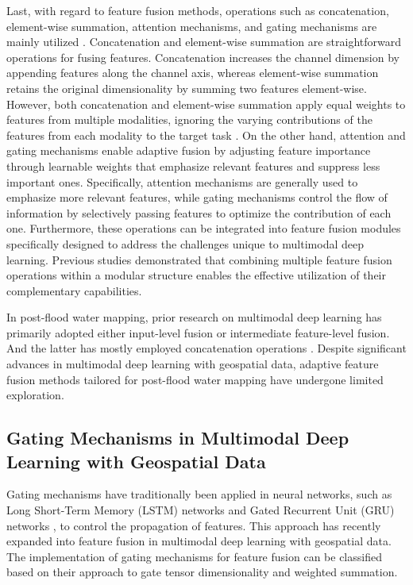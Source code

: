 \documentclass[preprint,12pt,authoryear]{elsarticle}
\begin{document}
Last, with regard to feature fusion methods, operations such as concatenation, element-wise summation, attention mechanisms, and gating mechanisms are mainly utilized \citep{huang2023deep, mena2024common}. Concatenation and element-wise summation are straightforward operations for fusing features. Concatenation increases the channel dimension by appending features along the channel axis, whereas element-wise summation retains the original dimensionality by summing two features element-wise. However, both concatenation and element-wise summation apply equal weights to features from multiple modalities, ignoring the varying contributions of the features from each modality to the target task \citep{li2020collaborative}. On the other hand, attention and gating mechanisms enable adaptive fusion by adjusting feature importance through learnable weights that emphasize relevant features and suppress less important ones. Specifically, attention mechanisms are generally used to emphasize more relevant features, while gating mechanisms control the flow of information by selectively passing features to optimize the contribution of each one. Furthermore, these operations can be integrated into feature fusion modules specifically designed to address the challenges unique to multimodal deep learning. Previous studies \citep{li2020collaborative, xu2023road} demonstrated that combining multiple feature fusion operations within a modular structure enables the effective utilization of their complementary capabilities.

In post-flood water mapping, prior research on multimodal deep learning has primarily adopted either input-level fusion \citep{bai2021enhancement, konapala2021exploring, wang2024multi} or intermediate feature-level fusion. And the latter has mostly employed concatenation operations \citep{drakonakis2022ombrianet, munoz2021local}. Despite significant advances in multimodal deep learning with geospatial data, adaptive feature fusion methods tailored for post-flood water mapping have undergone limited exploration.

\subsection{Gating Mechanisms in Multimodal Deep Learning with Geospatial Data}
\label{Section2.2}

Gating mechanisms have traditionally been applied in neural networks, such as Long Short-Term Memory (LSTM) networks \citep{hochreiter1997long} and Gated Recurrent Unit (GRU) networks \citep{cho2014learning}, to control the propagation of features. This approach has recently expanded into feature fusion in multimodal deep learning with geospatial data. The implementation of gating mechanisms for feature fusion can be classified based on their approach to gate tensor dimensionality and weighted summation. 
\end{document}
